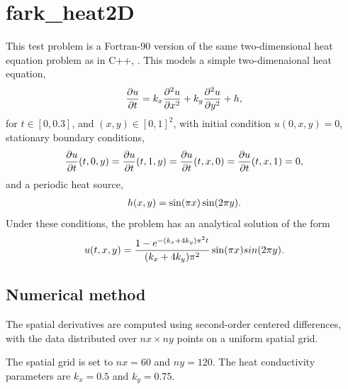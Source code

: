 \documentclass[letterpaper,10pt,english]{sphinxmanual}
\begin{document}
\section{fark\_heat2D}
\label{f90_parallel:fark-heat2d}\label{f90_parallel:id1}
This test problem is a Fortran-90 version of the same two-dimensional
heat equation problem as in C++, {\hyperref[cpp_parallel:ark-heat2d]{\emph{}}}.  This models a
simple two-dimenaional heat equation,
\begin{gather}
\begin{split}\frac{\partial u}{\partial t} = k_x \frac{\partial^2 u}{\partial x^2}
                              + k_y \frac{\partial^2 u}{\partial y^2} + h,\end{split}\notag
\end{gather}
for \(t \in [0, 0.3]\), and \((x,y) \in [0, 1]^2\), with initial
condition \(u(0,x,y) = 0\), stationary boundary conditions,
\begin{gather}
\begin{split}\frac{\partial u}{\partial t}(t,0,y) = \frac{\partial u}{\partial t}(t,1,y) =
\frac{\partial u}{\partial t}(t,x,0) = \frac{\partial u}{\partial t}(t,x,1) = 0,\end{split}\notag
\end{gather}
and a periodic heat source,
\begin{gather}
\begin{split}h(x,y) = \sin(\pi x) \sin(2\pi y).\end{split}\notag
\end{gather}
Under these conditions, the problem has an analytical solution of the
form
\begin{gather}
\begin{split}u(t,x,y) = \frac{1 - e^{-(k_x+4k_y)\pi^2 t}}{(k_x+4k_y)\pi^2} \sin(\pi x) sin(2\pi y).\end{split}\notag
\end{gather}

\subsection{Numerical method}
\label{f90_parallel:numerical-method}
The spatial derivatives are computed using second-order centered
differences, with the data distributed over \(nx\times ny\) points
on a uniform spatial grid.

The spatial grid is set to \(nx=60\) and \(ny=120\).  The heat
conductivity parameters are \(k_x=0.5\) and \(k_y=0.75\).
\end{document}
